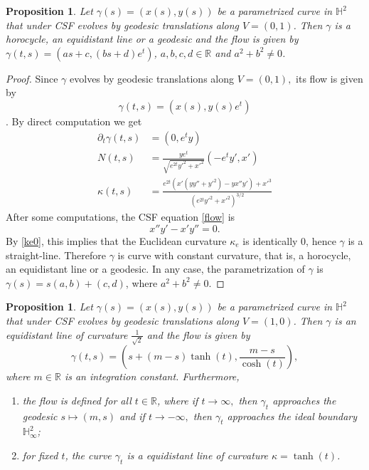 \documentclass[12pt]{amsart}
\theoremstyle{plain}
\newtheorem{proposition}[theorem]{Proposition}
\theoremstyle{definition}
\def\h{\mathbb H}
\def\r{\mathbb R}
\begin{document}
 
\begin{proposition}
\label{prop:A} 
Let $\gamma(s)=(x(s),y(s))$  be a parametrized curve in $\h^2$ that under CSF evolves by geodesic translations along $V=(0,1)$.   Then  $\gamma$ is a horocycle, an equidistant line or a geodesic and the flow is given by $\gamma(t,s) = (as+c, (bs+d)e^t)$, $a,b,c,d\in\r$ and  $a^2+b^2\not=0$.  
\end{proposition}

\begin{proof} Since $\gamma$ evolves by geodesic translations along $V = (0,1),$ its flow is given by $$\gamma(t,s) = (x(s), y(s)e^t)$$. 
 By direct computation we get 
\begin{equation*}
\begin{split}
\partial_t \gamma(t,s) &= (0,  e^{t}y) \\
N(t,s) &= \frac{ye^t}{\sqrt{e^{2 t} y'^2+x'^2}}\left(- e^{  t}y',x' \right)\\
\kappa(t,s)&=\frac{e^{2 t} \left(x' \left(y y''+y'^2\right)-y x'' y'\right)+x'^3}{\left(e^{2 t} y'^2+x'^2\right)^{3/2}}
\end{split}
\end{equation*}
After some computations, the CSF equation \eqref{flow} is 
\begin{equation*}
 x'' y'-x' y''=0.
\end{equation*}
By \eqref{ke0}, this implies that the Euclidean curvature $\kappa_e$ is identically $0$, hence $\gamma$ is a straight-line. Therefore $\gamma$ is curve with constant curvature, that is,   a horocycle, an equidistant line or a geodesic. In any case, the parametrization of $\gamma$ is $\gamma(s)=s(a,b)+(c,d)$, where $a^2+b^2\not=0$. 
\end{proof}
 

  \begin{proposition} 
   Let $\gamma(s)=(x(s),y(s))$  be a parametrized curve in $\h^2$ that under CSF evolves by geodesic translations along $V=(1,0)$.   Then $\gamma$ is an equidistant line of curvature $\frac{1}{\sqrt{2}}$  and the flow is given by 
    \begin{equation}\label{t1}
  \gamma(t,s)=\left(s+(m-s)\tanh(t),\frac{m-s}{\cosh(t)}\right),
  \end{equation}
 where $m\in\r$ is an integration constant.  Furthermore, 
 \begin{enumerate}
\item the flow is defined for all $t \in \r$, where if $t \to \infty,$ then $\gamma_t$ approaches the geodesic $s\mapsto (m,s)$
and  if $t \to - \infty,$ then $\gamma_t$ approaches the ideal boundary $\h^2_\infty$;
\item for fixed $t$, the curve $\gamma_t$ is a equidistant line of curvature $\kappa=\tanh(t)$. 
\end{enumerate}
 
 \end{proposition}
 
\end{document}
